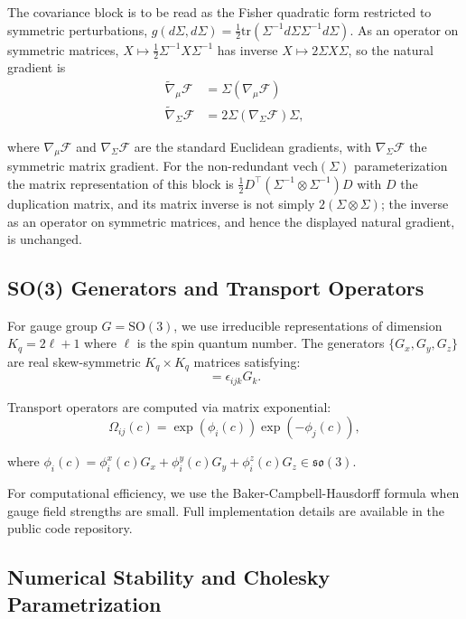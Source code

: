 \documentclass[11pt]{article}
\begin{document}
The covariance block is to be read as the Fisher quadratic form restricted to symmetric perturbations, $g(d\Sigma, d\Sigma) = \tfrac{1}{2}\mathrm{tr}(\Sigma^{-1} d\Sigma \Sigma^{-1} d\Sigma)$. As an operator on symmetric matrices, $X \mapsto \tfrac{1}{2}\Sigma^{-1}X\Sigma^{-1}$ has inverse $X \mapsto 2\Sigma X \Sigma$, so the natural gradient is
\begin{align}
\tilde{\nabla}_\mu \mathcal{F} &= \Sigma (\nabla_\mu \mathcal{F}) \\
\tilde{\nabla}_\Sigma \mathcal{F} &= 2\Sigma (\nabla_\Sigma \mathcal{F}) \Sigma,
\end{align}

where $\nabla_\mu \mathcal{F}$ and $\nabla_\Sigma \mathcal{F}$ are the standard Euclidean gradients, with $\nabla_\Sigma \mathcal{F}$ the symmetric matrix gradient. For the non-redundant $\mathrm{vech}(\Sigma)$ parameterization the matrix representation of this block is $\tfrac{1}{2}D^\top(\Sigma^{-1} \otimes \Sigma^{-1})D$ with $D$ the duplication matrix, and its matrix inverse is not simply $2(\Sigma \otimes \Sigma)$; the inverse as an operator on symmetric matrices, and hence the displayed natural gradient, is unchanged.

\subsection{SO(3) Generators and Transport Operators}

For gauge group $G = \mathrm{SO}(3)$, we use irreducible representations of dimension $K_q = 2\ell + 1$ where $\ell$ is the spin quantum number. The generators $\{G_x, G_y, G_z\}$ are real skew-symmetric $K_q \times K_q$ matrices satisfying:
\begin{equation}
[G_i, G_j] = \epsilon_{ijk} G_k.
\end{equation}

Transport operators are computed via matrix exponential:
\begin{equation}
\Omega_{ij}(c) = \exp(\phi_i(c)) \exp(-\phi_j(c)),
\end{equation}

where $\phi_i(c) = \phi_i^x(c) G_x + \phi_i^y(c) G_y + \phi_i^z(c) G_z \in \mathfrak{so}(3)$.

For computational efficiency, we use the Baker-Campbell-Hausdorff formula when gauge field strengths are small. Full implementation details are available in the public code repository.

\subsection{Numerical Stability and Cholesky Parametrization}
\end{document}
